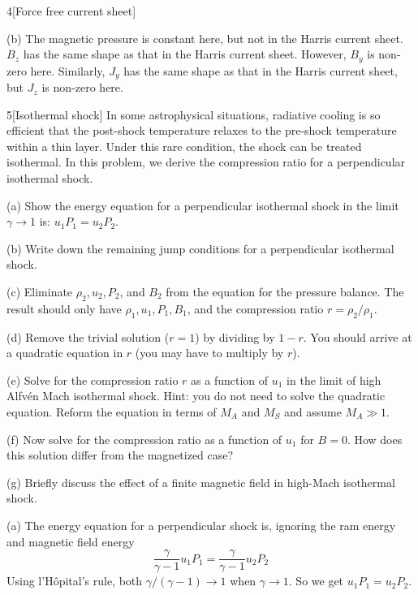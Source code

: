 \documentclass[12pt]{article}
\begin{document}
\begin{problem}{4}[Force free current sheet]
\begin{solution}
\begin{center}
\end{center}

(b) The magnetic pressure is constant here, but not in the Harris
current sheet. $B_z$ has the same shape as that in the Harris current sheet. 
However, $B_y$ is non-zero here. Similarly, $J_y$ has the same shape as that in
the Harris current sheet, but $J_z$ is non-zero here.
\end{solution}
\end{problem}
\begin{problem}{5}[Isothermal shock]
In some astrophysical situations, radiative cooling is so efficient that the
post-shock temperature relaxes to the pre-shock temperature within a thin layer.
Under this rare condition, the shock can be treated isothermal. In this problem,
we derive the compression ratio for a perpendicular isothermal shock.

(a) Show the energy equation for a perpendicular isothermal shock in the limit
$\gamma\to1$ is: $u_1P_1=u_2P_2$.

(b) Write down the remaining jump conditions for a perpendicular isothermal
shock.

(c) Eliminate $\rho_2,u_2,P_2$, and $B_2$ from the equation for the pressure
balance. The result should only have $\rho_1,u_1,P_1,B_1$, and the compression
ratio $r=\rho_2/\rho_1$.

(d) Remove the trivial solution ($r=1$) by dividing by $1-r$. You should arrive
at a quadratic equation in $r$ (you may have to multiply by $r$).

(e) Solve for the compression ratio $r$ as a function of $u_1$ in the limit of
high Alfvén Mach isothermal shock. Hint: you do not need to solve the quadratic
equation. Reform the equation in terms of $M_A$ and $M_S$ and assume $M_A\gg 1$.

(f) Now solve for the compression ratio as a function of $u_1$ for $B=0$. How
does this solution differ from the magnetized case?

(g) Briefly discuss the effect of a finite magnetic field in high-Mach
isothermal shock.
\begin{solution}
(a) The energy equation for a perpendicular shock is, ignoring the ram energy
and magnetic field energy
\begin{equation}
    \frac{\gamma}{\gamma-1}u_1P_1=\frac{\gamma}{\gamma-1}u_2P_2 
\end{equation}
Using l'Hôpital's rule, both $\gamma/(\gamma-1)\to1$ when $\gamma\to1$. So we
get $u_1P_1=u_2P_2$.


\end{solution}
\end{problem}
\end{document}
